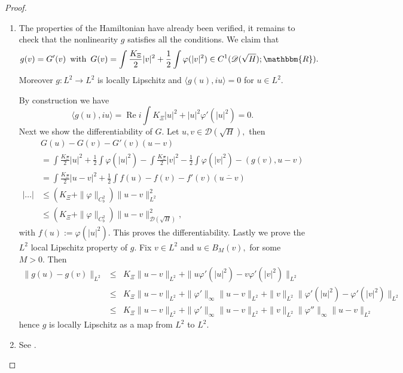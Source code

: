 \documentclass[11pt, oneside]{article}   	%
\newcommand{\assign}{:=}
\newcommand{\tmop}[1]{\ensuremath{\operatorname{#1}}}
\newenvironment{enumeratenumeric}{\begin{enumerate}[1.] }{\end{enumerate}}
\begin{document}
\begin{proof}
	\begin{enumeratenumeric}
		\item The properties of the Hamiltonian have already been verified, it
		remains to check that the nonlinearity $g$ satisfies all the conditions. We claim that
		\[ g (v) = G' (v)\  \tmop{with} \  G (v) = \int \frac{K_{\Xi}}{2} | v |^2 +
		\frac{1}{2} \int \varphi (| v |^2) \in C^1 ( \mathscr{D} (
		\sqrt{{H}} ) ; \mathbbm{R} ) . \]
		Moreover $g : L^2 \rightarrow L^2$ is locally Lipschitz and $\langle g (u), i u\rangle
		= 0$ for $u \in L^2 .$
		
		By construction we have
		\[ \langle g (u), i u\rangle = \tmop{Re} i \int K_{\Xi} | u |^2 + | u |^2 \varphi' (|
		u |^2) = 0. \]
		Next we show the differentiability of $G.$ Let $u, v \in \mathscr{D}( \sqrt{{H}}),$ then
		\begin{align*}
			& G (u) - G (v) - G' (v) (u - v) \\ & =  \int \frac{K_{\Xi}}{2} | u |^2 +
			\frac{1}{2} \int \varphi (| u |^2) - \int \frac{K_{\Xi}}{2} | v |^2 -
			\frac{1}{2} \int \varphi (| v |^2) - (g (v), u - v)\\
			& =  \int \frac{K_{\Xi}}{2} | u - v |^2 + \frac{1}{2} \int f (u) - f
			(v) - f' (v) (\overline{u - v})\\
			| \ldots | & \le  (K_{\Xi} + \| \varphi \|_{C_b^2}) \| u - v
			\|^2_{L^2}\\
			& \le  (K_{\Xi} + \| \varphi \|_{C_b^2}) \| u - v
			\|^2_{\mathscr{D} ( \sqrt{{H}} )},
		\end{align*}
		with $f (u) \assign \varphi (| u |^2) .$ This proves the
		differentiability. Lastly we prove the $L^2 $ local Lipschitz property of
		$g.$ Fix $v \in L^2$ and $u \in B_M (v),$ for some $M > 0.$ Then
		\begin{eqnarray*}
			\| g (u) - g (v) \|_{L^2} & \le & K_{\Xi} \| u - v \|_{L^2} + \| u
			\varphi' (| u |^2) - v \varphi' (| v |^2) \|_{L^2}\\
			& \le & K_{\Xi} \| u - v \|_{L^2} + \| \varphi' \|_{\infty} \| u
			- v \|_{L^2} + \| v \|_{L^2} \| \varphi' (| u |^2) - \varphi' (| v |^2)
			\|_{L^2}\\
			& \le & K_{\Xi} \| u - v \|_{L^2} + \| \varphi' \|_{\infty} \| u
			- v \|_{L^2} + \| v \|_{L^2} \| \varphi'' \|_{\infty} \| u - v \|_{L^2}
		\end{eqnarray*}
		hence $g$ is locally Lipschitz as a map from $L^2$ to $L^2 .$
		
		\item  See  \cite[Chapter X.13]{reedsimon2}.
	\end{enumeratenumeric}
\end{proof}
\end{document}
